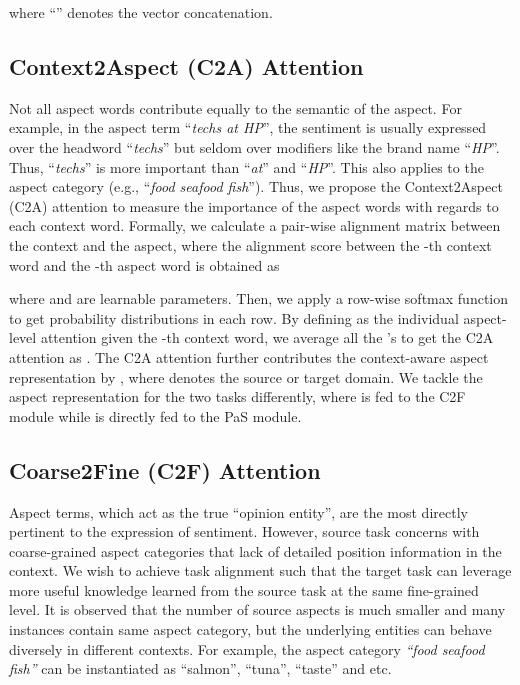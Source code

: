 \documentclass[letterpaper]{article} \usepackage{aaai19}  \usepackage{times}  \usepackage{latexsym}
\begin{document}
where ``'' denotes the vector concatenation.

\subsection{Context2Aspect (C2A) Attention}
\label{catr}
Not all aspect words contribute equally to the semantic of the aspect. For example, in the aspect term ``{\it techs at HP}'', the sentiment is usually expressed over the headword ``{\it techs}'' but seldom over modifiers like the brand name ``{\it HP}''. Thus, ``{\it techs}'' is more important than ``{\it at}'' and ``{\it HP}''. This also applies to the aspect category (e.g., ``{\it food seafood fish}''). Thus, we propose the Context2Aspect (C2A) attention to measure the importance of the aspect words with regards to each context word. Formally, we calculate a pair-wise alignment matrix  between the context and the aspect, where the alignment score  between the -th context word and the -th aspect word is obtained as

where  and  are learnable parameters. Then, we apply a row-wise softmax function to get probability distributions in each row. By defining  as the individual aspect-level attention given the -th context word, we average all the 's to get the C2A attention as . The C2A attention further contributes the context-aware aspect representation by , where  denotes the source or target domain. We tackle the aspect representation  for the two tasks differently, where  is fed to the C2F module while  is directly fed to the PaS module.





\subsection{Coarse2Fine (C2F) Attention}
Aspect terms, which act as the true ``opinion entity'', are the most directly pertinent to the expression of sentiment. However, source task concerns with coarse-grained aspect categories that lack of detailed position information in the context. We wish to achieve task alignment such that the target task can leverage more useful knowledge learned from the source task at the same fine-grained level. It is observed that the number of source aspects is much smaller and many instances contain same aspect category, but the underlying entities can behave diversely in different contexts. For example, the aspect category {\it ``food seafood fish''} can be instantiated as ``salmon'', ``tuna'', ``taste'' and etc. 
\end{document}
